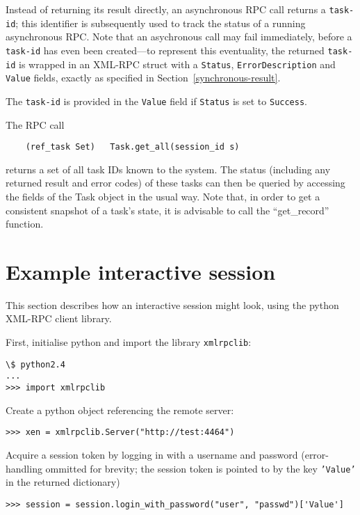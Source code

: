 Instead of returning its result directly, an asynchronous RPC call
returns a {\tt task-id}; this identifier is subsequently used
to track the status of a running asynchronous RPC. Note that an asychronous
call may fail immediately, before a {\tt task-id} has even been created---to
represent this eventuality, the returned {\tt task-id}
is wrapped in an XML-RPC struct with a {\tt Status}, {\tt ErrorDescription} and
{\tt Value} fields, exactly as specified in Section~\ref{synchronous-result}.

The {\tt task-id} is provided in the {\tt Value} field if {\tt Status} is set to
{\tt Success}.

The RPC call
\begin{verbatim}
    (ref_task Set)   Task.get_all(session_id s)
\end{verbatim} 
returns a set of all task IDs known to the system. The status (including any
returned result and error codes) of these tasks
can then be queried by accessing the fields of the Task object in the usual way. 
Note that, in order to get a consistent snapshot of a task's state, it is advisable to call the ``get\_record'' function.

\section{Example interactive session}

This section describes how an interactive session might look, using the python
XML-RPC client library. 

First, initialise python and import the library {\tt xmlrpclib}:

\begin{verbatim}
\$ python2.4
...
>>> import xmlrpclib
\end{verbatim}

Create a python object referencing the remote server:

\begin{verbatim}
>>> xen = xmlrpclib.Server("http://test:4464")
\end{verbatim}

Acquire a session token by logging in with a username and password
(error-handling ommitted for brevity; the session token is pointed to by the
key {\tt 'Value'} in the returned dictionary)

\begin{verbatim}
>>> session = session.login_with_password("user", "passwd")['Value']
\end{verbatim}

